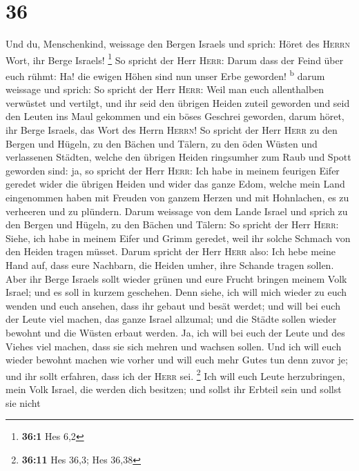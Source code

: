 \hypertarget{section-35}{%
\section{36}\label{section-35}}

 Und du, Menschenkind, weissage den Bergen Israels und
sprich: Höret des \textsc{Herrn} Wort, ihr Berge Israels! \footnote{\textbf{36:1}
  Hes 6,2}  So spricht der Herr \textsc{Herr}: Darum dass
der Feind über euch rühmt: Ha! die ewigen Höhen sind nun unser Erbe
geworden! \textsuperscript{b}  darum weissage und sprich:
So spricht der Herr \textsc{Herr}: Weil man euch allenthalben verwüstet
und vertilgt, und ihr seid den übrigen Heiden zuteil geworden und seid
den Leuten ins Maul gekommen und ein böses Geschrei geworden,
 darum höret, ihr Berge Israels, das Wort des Herrn
\textsc{Herrn}! So spricht der Herr \textsc{Herr} zu den Bergen und
Hügeln, zu den Bächen und Tälern, zu den öden Wüsten und verlassenen
Städten, welche den übrigen Heiden ringsumher zum Raub und Spott
geworden sind:  ja, so spricht der Herr \textsc{Herr}: Ich
habe in meinem feurigen Eifer geredet wider die übrigen Heiden und wider
das ganze Edom, welche mein Land eingenommen haben mit Freuden von
ganzem Herzen und mit Hohnlachen, es zu verheeren und zu plündern.
 Darum weissage von dem Lande Israel und sprich zu den
Bergen und Hügeln, zu den Bächen und Tälern: So spricht der Herr
\textsc{Herr}: Siehe, ich habe in meinem Eifer und Grimm geredet, weil
ihr solche Schmach von den Heiden tragen müsset.  Darum
spricht der Herr \textsc{Herr} also: Ich hebe meine Hand auf, dass eure
Nachbarn, die Heiden umher, ihre Schande tragen sollen. 
Aber ihr Berge Israels sollt wieder grünen und eure Frucht bringen
meinem Volk Israel; und es soll in kurzem geschehen.  Denn
siehe, ich will mich wieder zu euch wenden und euch ansehen, dass ihr
gebaut und besät werdet;  und will bei euch der Leute
viel machen, das ganze Israel allzumal; und die Städte sollen wieder
bewohnt und die Wüsten erbaut werden.  Ja, ich will bei
euch der Leute und des Viehes viel machen, dass sie sich mehren und
wachsen sollen. Und ich will euch wieder bewohnt machen wie vorher und
will euch mehr Gutes tun denn zuvor je; und ihr sollt erfahren, dass ich
der \textsc{Herr} sei. \footnote{\textbf{36:11} Hes 36,3; Hes 36,38}
 Ich will euch Leute herzubringen, mein Volk Israel, die
werden dich besitzen; und sollst ihr Erbteil sein und sollst sie nicht
